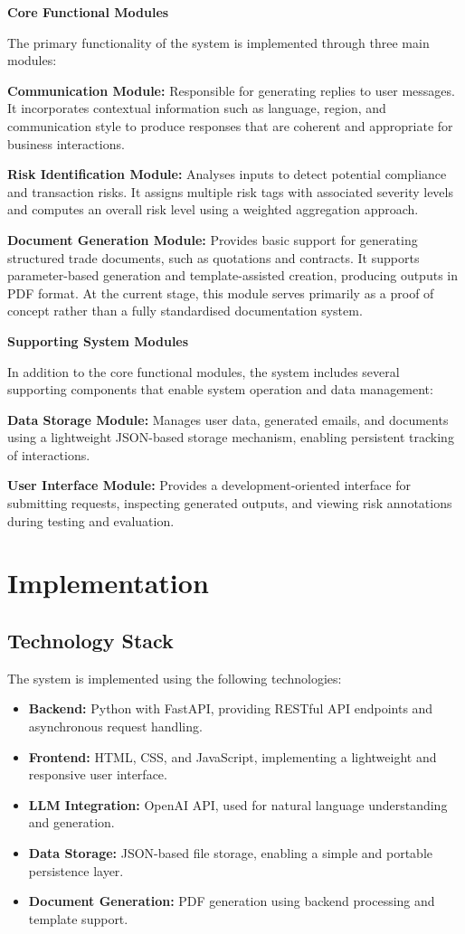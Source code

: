 \documentclass[12pt,a4paper]{report}
\begin{document}
\textbf{Core Functional Modules}

The primary functionality of the system is implemented through three main modules:

\textbf{Communication Module:} Responsible for generating replies to user messages. It incorporates contextual information such as language, region, and communication style to produce responses that are coherent and appropriate for business interactions.

\textbf{Risk Identification Module:} Analyses inputs to detect potential compliance and transaction risks. It assigns multiple risk tags with associated severity levels and computes an overall risk level using a weighted aggregation approach.

\textbf{Document Generation Module:} Provides basic support for generating structured trade documents, such as quotations and contracts. It supports parameter-based generation and template-assisted creation, producing outputs in PDF format. At the current stage, this module serves primarily as a proof of concept rather than a fully standardised documentation system.

\textbf{Supporting System Modules}

In addition to the core functional modules, the system includes several supporting components that enable system operation and data management:

\textbf{Data Storage Module:} Manages user data, generated emails, and documents using a lightweight JSON-based storage mechanism, enabling persistent tracking of interactions.

\textbf{User Interface Module:} Provides a development-oriented interface for submitting requests, inspecting generated outputs, and viewing risk annotations during testing and evaluation.

\section{Implementation}

\subsection{Technology Stack}

The system is implemented using the following technologies:

\begin{itemize}
    \item \textbf{Backend:} Python with FastAPI, providing RESTful API endpoints and asynchronous request handling.
    \item \textbf{Frontend:} HTML, CSS, and JavaScript, implementing a lightweight and responsive user interface.
    \item \textbf{LLM Integration:} OpenAI API, used for natural language understanding and generation.
    \item \textbf{Data Storage:} JSON-based file storage, enabling a simple and portable persistence layer.
    \item \textbf{Document Generation:} PDF generation using backend processing and template support.
\end{itemize}
\end{document}
